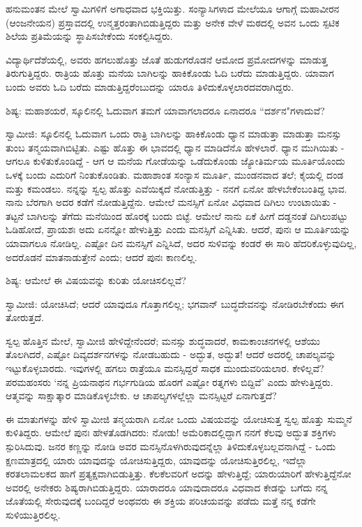 ಹನುಮಂತನ ಮೇಲೆ ಸ್ವಾಮಿಗಳಿಗೆ ಅಗಾಧವಾದ ಭಕ್ತಿಯಿತ್ತು. ಸಂನ್ಯಾಸಿಗಳಾದ ಮೇಲೆಯೂ ಆಗಾಗ್ಗೆ ಮಹಾವೀರನ (ಆಂಜನೇಯನ) ಪ್ರಸ್ತಾವದಲ್ಲಿ ಉನ್ಮತ್ತರಂತಾಗಿಬಿಡುತ್ತಿದ್ದರು ಮತ್ತು ಅನೇಕ ವೇಳೆ ಮಠದಲ್ಲಿ ಅವನ ಒಂದು ಸ್ಪಟಿಕ ಶಿಲೆಯ ಪ್ರತಿಮೆಯನ್ನು ಸ್ಥಾಪಿಸಬೇಕೆಂದು ಸಂಕಲ್ಪಿಸಿದ್ದರು.

ವಿದ್ಯಾರ್ಥಿದೆಶೆಯಲ್ಲಿ, ಅವರು ಹಗಲುಹೊತ್ತು ಜೊತೆ ಹುಡುಗರೊಡನೆ ಆಮೋದ ಪ್ರಮೋದಗಳನ್ನು ಮಾಡುತ್ತ ತಿರುಗುತ್ತಿದ್ದರು. ರಾತ್ರಿಯ ಹೊತ್ತು ಮನೆಯ ಬಾಗಿಲನ್ನು ಹಾಕಿಕೊಂಡು ಓದಿ ಬರೆದು ಮಾಡುತ್ತಿದ್ದರು. ಯಾವಾಗ ಬಂದು ಅವರು ಓದಿ ಬರೆದು ಮಾಡುತ್ತಿದ್ದರೆಂಬುದನ್ನು ಯಾರೂ ತಿಳಿದುಕೊಳ್ಳಲಾರದವರಾಗಿದ್ದರು.

\delimiter

ಶಿಷ್ಯ: ಮಹಾಶಯರೆ, ಸ್ಕೂಲಿನಲ್ಲಿ ಓದುವಾಗ ತಮಗೆ ಯಾವಾಗಲಾದರೂ ಏನಾದರೂ “ದರ್ಶನ"ಗಳಾದುವೆ?

ಸ್ವಾಮೀಜಿ: ಸ್ಕೂಲಿನಲ್ಲಿ ಓದುವಾಗ ಒಂದು ರಾತ್ರಿ ಬಾಗಿಲನ್ನು ಹಾಕಿಕೊಂಡು ಧ್ಯಾನ ಮಾಡುತ್ತಾ ಮಾಡುತ್ತಾ ಮನಸ್ಸು ತುಂಬ ತನ್ಮಯವಾಗಿಬಿಟ್ಟಿತು. ಎಷ್ಟು ಹೊತ್ತು ಈ ಭಾವದಲ್ಲಿ ಧ್ಯಾನ ಮಾಡಿದೆನೊ ಹೇಳಲಾರೆ. ಧ್ಯಾನ ಮುಗಿಯಿತು - ಆಗಲೂ ಕುಳಿತುಕೊಂಡಿದ್ದೆ - ಆಗ ಆ ಮನೆಯ ಗೋಡೆಯನ್ನು ಒಡೆದುಕೊಂಡು ಜ್ಯೋತಿರ್ಮಯ ಮೂರ್ತಿಯೊಂದು ಒಳಕ್ಕೆ ಬಂದು ಎದುರಿಗೆ ನಿಂತುಕೊಂಡಿತು. ಮಹಾಶಾಂತ ಸಂನ್ಯಾಸ ಮೂರ್ತಿ, ಮುಂಡನವಾದ ತಲೆ; ಕೈಯಲ್ಲಿ ದಂಡ ಮತ್ತು ಕಮಂಡಲು. ನನ್ನನ್ನು ಸ್ವಲ್ಪ ಹೊತ್ತು ಎವೆಯಿಕ್ಕದೆ ನೋಡುತ್ತಿತ್ತು - ನನಗೆ ಏನೋ ಹೇಳಬೇಕೆಂಬಂತಿದ್ದ ಭಾವ. ನಾನು ಬೆರಗಾಗಿ ಅದರ ಕಡೆಗೆ ನೋಡುತ್ತಿದ್ದೆನು. ಆಮೇಲೆ ಮನಸ್ಸಿಗೆ ಏನೋ ವಿಧವಾದ ದಿಗಿಲು ಉಂಟಾಯಿತು - ತಟ್ಟನೆ ಬಾಗಿಲನ್ನು ತೆಗೆದು ಮನೆಯಿಂದ ಹೊರಕ್ಕೆ ಬಂದು ಬಿಟ್ಟೆ. ಆಮೇಲೆ ನಾನು ಏಕೆ ಹೀಗೆ ದಡ್ಡನಂತೆ ದಿಗಿಲುಪಟ್ಟು ಓಡಿಹೋದೆ, ಪ್ರಾಯಶಃ ಅದು ಏನನ್ನೋ ಹೇಳುತ್ತಿತ್ತು ಎಂದು ಮನಸ್ಸಿಗೆ ಎನ್ನಿಸಿತು. ಆದರೆ, ಪುನಃ ಆ ಮೂರ್ತಿಯನ್ನು ಯಾವಾಗಲೂ ನೋಡಿಲ್ಲ. ಎಷ್ಟೋ ದಿನ ಮನಸ್ಸಿಗೆ ಎನ್ನಿಸಿದೆ, ಅದರ ಸುಳಿವನ್ನು ಕಂಡರೆ ಈ ಸಾರಿ ಹೆದರಿಕೊಳ್ಳುವುದಿಲ್ಲ, ಅದರೊಡನೆ ಮಾತನಾಡುತ್ತೇನೆ ಎಂದು; ಆದರೆ ಪುನಃ ಕಾಣಲಿಲ್ಲ.

ಶಿಷ್ಯ: ಆಮೇಲೆ ಈ ವಿಷಯವನ್ನು ಕುರಿತು ಯೋಚಿಸಲಿಲ್ಲವೆ?

ಸ್ವಾಮೀಜಿ: ಯೋಚಿಸಿದೆ; ಆದರೆ ಯಾವುದೂ ಗೊತ್ತಾಗಲಿಲ್ಲ; ಭಗವಾನ್ ಬುದ್ಧದೇವನನ್ನು ನೋಡಿರಬೇಕೆಂದು ಈಗ ತೋರುತ್ತದೆ.

ಸ್ವಲ್ಪ ಹೊತ್ತಿನ ಮೇಲೆ, ಸ್ವಾಮೀಜಿ ಹೇಳಿದ್ದೇನೆಂದರೆ; ಮನಸ್ಸು ಶುದ್ಧವಾದರೆ, ಕಾಮಕಾಂಚನಗಳಲ್ಲಿ ಆಶೆಯು ತೊಲಗಿದರೆ, ಎಷ್ಟೋ ದಿವ್ಯದರ್ಶನಗಳನ್ನು ನೋಡಬಹುದು - ಅದ್ಭುತ, ಅದ್ಭುತ! ಆದರೆ ಅದರಲ್ಲಿ ಚಾಪಲ್ಯವನ್ನು ಇಟ್ಟುಕೊಳ್ಳಬಾರದು. ಇವುಗಳಲ್ಲಿ ಹಗಲು ರಾತ್ರೆಯೂ ಮನಸ್ಸಿದ್ದರೆ ಸಾಧಕ ಮುಂದುವರಿಯಲಾರ. ಕೇಳಿಲ್ಲವೆ? ಪರಮಹಂಸರು ‘ನನ್ನ ಪ್ರಿಯನಾಥನ ಗರ್ಭಗುಡಿಯ ಹೊರಗೆ ಎಷ್ಟೋ ರತ್ನಗಳು ಬಿದ್ದಿವೆ’ ಎಂದು ಹೇಳುತ್ತಿದ್ದರು. ಆತ್ಮವನ್ನು ಸಾಕ್ಷಾತ್ಕಾರ ಮಾಡಿಕೊಳ್ಳಬೇಕು. ಆ ಚಾಪಲ್ಯಗಳಲ್ಲೆಲ್ಲಾ ಮನಸ್ಸಿಟ್ಟರೆ ಏನಾಗುತ್ತದೆ?

ಈ ಮಾತುಗಳನ್ನು ಹೇಳಿ ಸ್ವಾಮೀಜಿ ತನ್ಮಯರಾಗಿ ಏನೋ ಒಂದು ವಿಷಯವನ್ನು ಯೋಚಿಸುತ್ತ ಸ್ವಲ್ಪ ಹೊತ್ತು ಸುಮ್ಮನೆ ಕುಳಿತಿದ್ದರು. ಆಮೇಲೆ ಪುನಃ ಹೇಳತೊಡಗಿದರು: ನೋಡು! ಅಮೆರಿಕಾದಲ್ಲಿದ್ದಾಗ ನನಗೆ ಕೆಲವು ಅದ್ಭುತ ಶಕ್ತಿಗಳು ಸ್ಪುರಿಸಿದುವು. ಜನರ ಕಣ್ಣನ್ನು ನೋಡಿ ಅವರ ಮನಸ್ಸಿನೊಳಗಿರುವುದನ್ನೆಲ್ಲಾ ತಿಳಿದುಕೊಳ್ಳಬಲ್ಲವನಾಗಿದ್ದೆ - ಒಂದು ಕ್ಷಣಮಾತ್ರದಲ್ಲಿ ಯಾರು ಯಾವುದನ್ನು ಯೋಚಿಸುತ್ತಿದ್ದರು, ಯಾವುದನ್ನು ಯೋಚಿಸುತ್ತಿರಲಿಲ್ಲ, ಇದೆಲ್ಲಾ ಕರತಲಾಮಲಕದ ಹಾಗೆ ಪ್ರತ್ಯಕ್ಷವಾಗಿಬಿಡುತ್ತಿತ್ತು. ಕೆಲಕೆಲವರಿಗೆ ಅದನ್ನು ಹೇಳುತ್ತಿದ್ದೆ; ಯಾರುಯಾರಿಗೆ ಹೇಳುತ್ತಿದ್ದೆನೋ ಅವರಲ್ಲಿ ಅನೇಕರು ಶಿಷ್ಯರಾಗಿಬಿಡುತ್ತಿದ್ದರು. ಯಾರಾದರೂ ಯಾವುದಾದರೂ ವಿಧವಾದ ಕೇಡನ್ನು ಬಗೆದು ನನ್ನ ಜೊತೆಯಲ್ಲಿ ಸೇರುವುದಕ್ಕೆ ಬಂದಿದ್ದರೆ ಅಂಥವರು ಈ ಶಕ್ತಿಯ ಪರಿಚಯವನ್ನು ಪಡೆದು ಮತ್ತೆ ನನ್ನ ಕಡೆಗೇ ಸುಳಿಯುತ್ತಿರಲಿಲ್ಲ.

